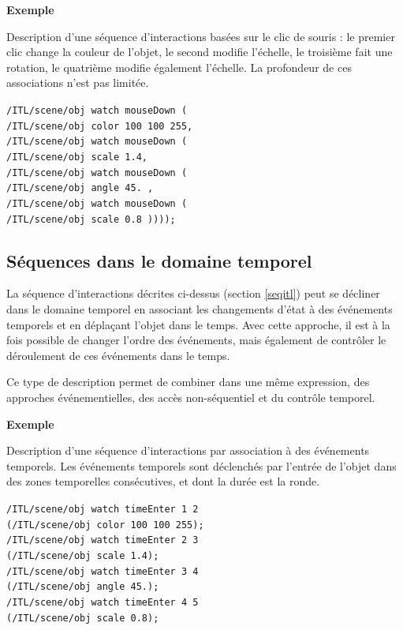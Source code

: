 \documentclass{article}
\newcommand{\sample}	[1]		{\begin{center}\colorbox{mygrey}{
								\begin{minipage}[t]{0.95\columnwidth} 
								{\small \texttt{#1}}
								\end{minipage}}\end{center}}
\newcounter{excount}
\newcommand{\exemple}			{\vspace{1mm} \hspace*{-4.5mm}\textbf{Exemple \arabic{excount}} \addtocounter{excount}{1}}
\begin{document}
\exemple   Description d'une séquence d'interactions basées sur le clic de souris : le premier clic change la couleur de l'objet, le second modifie l'échelle, le troisième fait une rotation, le quatrième modifie également l'échelle. La profondeur de ces associations n'est pas limitée. 
\sample{/ITL/scene/obj watch mouseDown ( 		\\
\hspace*{4mm}/ITL/scene/obj color 100 100 255,	\\
\hspace*{4mm}/ITL/scene/obj watch mouseDown (		\\
\hspace*{8mm}/ITL/scene/obj scale 1.4,			\\
\hspace*{8mm}/ITL/scene/obj watch mouseDown ( \\
\hspace*{12mm}/ITL/scene/obj angle 45. ,	 \\
\hspace*{12mm}/ITL/scene/obj watch mouseDown ( \\
\hspace*{16mm}/ITL/scene/obj scale 0.8 ))));
}


\subsection{Séquences dans le domaine temporel}

La séquence d'interactions décrites ci-dessus (section \ref{seqitl}) peut se décliner dans le domaine temporel en associant les changements d'état à des événements temporels et en déplaçant l'objet dans le temps. Avec cette approche, il est à la fois possible de changer l'ordre des événements, mais également de contrôler le déroulement de ces événements dans le temps.

Ce type de description permet de combiner dans une même expression, des approches événementielles, des accès non-séquentiel et du contrôle temporel.

\exemple   Description d'une séquence d'interactions par association à des événements temporels. Les événements temporels sont déclenchés par l'entrée de l'objet dans des zones temporelles consécutives, et dont la durée est la ronde. 
\sample{/ITL/scene/obj watch timeEnter 1 2	\\
\hspace*{10mm}(/ITL/scene/obj color 100 100 255);	\\
/ITL/scene/obj watch timeEnter 2 3	\\
\hspace*{10mm}(/ITL/scene/obj scale 1.4);	\\
/ITL/scene/obj watch timeEnter 3 4	\\
\hspace*{10mm}(/ITL/scene/obj angle 45.);	\\
/ITL/scene/obj watch timeEnter 4 5	\\
\hspace*{10mm}(/ITL/scene/obj scale 0.8);
}
\end{document}

